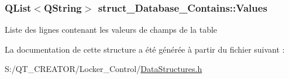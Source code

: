 \subsubsection[{Values}]{\setlength{\rightskip}{0pt plus 5cm}Q\+List$<$Q\+String$>$ struct\+\_\+\+Database\+\_\+\+Contains\+::\+Values}\label{structstruct___database___contains_ad6a0d26c2252dd085c56c29c438a132c}
Liste des lignes contenant les valeurs de champs de la table 

La documentation de cette structure a été générée à partir du fichier suivant \+:\begin{DoxyCompactItemize}
\item 
S\+:/\+Q\+T\+\_\+\+C\+R\+E\+A\+T\+O\+R/\+Locker\+\_\+\+Control/\hyperlink{_data_structures_8h}{Data\+Structures.\+h}\end{DoxyCompactItemize}
